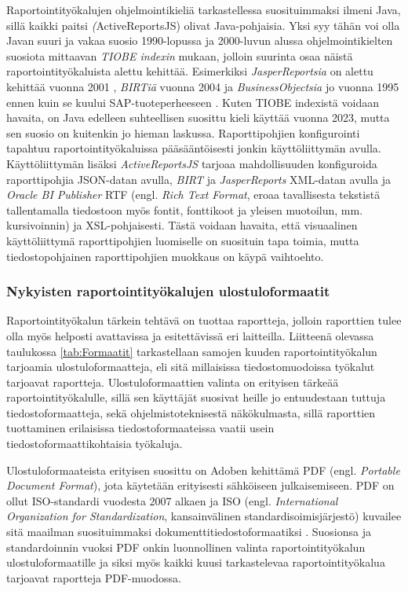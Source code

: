 Raportointityökalujen ohjelmointikieliä tarkastellessa suosituimmaksi ilmeni Java, sillä kaikki paitsi \textit(ActiveReportsJS) olivat Java-pohjaisia. Yksi syy tähän voi olla Javan suuri ja vakaa suosio 1990-lopussa ja 2000-luvun alussa ohjelmointikielten suosiota mittaavan \textit{TIOBE indexin} mukaan\cite{noauthor_tiobe_nodate}, jolloin suurinta osaa näistä raportointityökaluista alettu kehittää. Esimerkiksi \textit{JasperReportsia} on alettu kehittää vuonna 2001 \cite{noauthor_origin_2006}, \textit{BIRTiä} vuonna 2004 \cite{noauthor_eclipse_2004} ja \textit{BusinessObjectsia} jo vuonna 1995 ennen kuin se kuului SAP-tuoteperheeseen \cite{alma9922048891805971}. Kuten {TIOBE indexistä} voidaan havaita, on Java edelleen suhteellisen suosittu kieli käyttää vuonna 2023, mutta sen suosio on kuitenkin jo hieman laskussa. Raporttipohjien konfigurointi tapahtuu raportointityökaluissa pääsääntöisesti jonkin käyttöliittymän avulla. Käyttöliittymän lisäksi \textit{ActiveReportsJS} tarjoaa mahdollisuuden konfiguroida raporttipohjia JSON-datan avulla, \textit{BIRT} ja  \textit{JasperReports} XML-datan avulla ja \textit{Oracle BI Publisher} RTF (engl. \textit{Rich Text Format}, eroaa tavallisesta tekstistä tallentamalla tiedostoon myös fontit, fonttikoot ja yleisen muotoilun, mm. kursivoinnin) ja XSL-pohjaisesti. Tästä voidaan havaita, että visuaalinen käyttöliittymä raporttipohjien luomiselle on suosituin tapa toimia, mutta tiedostopohjainen raporttipohjien muokkaus on käypä vaihtoehto.

\subsubsection{Nykyisten raportointityökalujen ulostuloformaatit}

Raportointityökalun tärkein tehtävä on tuottaa raportteja, jolloin raporttien tulee olla myös helposti avattavissa ja esitettävissä eri laitteilla. Liitteenä olevassa taulukossa \ref{tab:Formaatit} tarkastellaan samojen kuuden raportointityökalun tarjoamia ulostuloformaatteja, eli sitä millaisissa tiedostomuodoissa työkalut tarjoavat raportteja. Ulostuloformaattien valinta on erityisen tärkeää raportointityökalulle, sillä sen käyttäjät suosivat heille jo entuudestaan tuttuja tiedostoformaatteja, sekä ohjelmistoteknisestä näkökulmasta, sillä raporttien tuottaminen erilaisissa tiedostoformaateissa vaatii usein tiedostoformaattikohtaisia työkaluja.

Ulostuloformaateista erityisen suosittu on Adoben kehittämä PDF (engl. \textit{Portable Document Format}), jota käytetään erityisesti sähköiseen julkaisemiseen. PDF on ollut ISO-standardi vuodesta 2007 alkaen ja ISO (engl. \textit{International Organization for Standardization}, kansainvälinen standardisoimisjärjestö) kuvailee sitä maailman suosituimmaksi dokumenttitiedostoformaatiksi \cite{naden_standard_2021}. Suosionsa ja standardoinnin vuoksi PDF onkin luonnollinen valinta raportointityökalun ulostuloformaatille ja siksi myös kaikki kuusi tarkastelevaa raportointityökalua tarjoavat raportteja PDF-muodossa.

